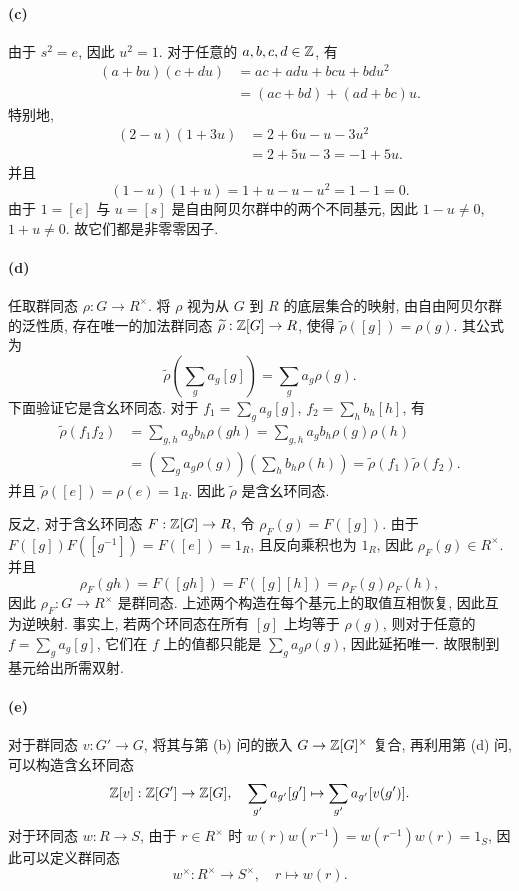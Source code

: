 \documentclass{article}
\begin{document}
\begin{solution}
	\paragraph{(c)} 由于 $s^2 = e$, 因此 $u^2 = 1$. 对于任意的 $a, b, c, d \in \mathbb{Z}$, 有
	\begin{align*}
		(a + bu)(c + du)
		&= ac + adu + bcu + bdu^2 \\
		&= (ac + bd) + (ad + bc)u.
	\end{align*}
	特别地,
	\begin{align*}
		(2 - u)(1 + 3u)
		&= 2 + 6u - u - 3u^2 \\
		&= 2 + 5u - 3 = -1 + 5u.
	\end{align*}
	并且
	\[ (1 - u)(1 + u) = 1 + u - u - u^2 = 1 - 1 = 0. \]
	由于 $1 = [e]$ 与 $u = [s]$ 是自由阿贝尔群中的两个不同基元, 因此 $1 - u \neq 0$, $1 + u \neq 0$. 故它们都是非零零因子.

	\paragraph{(d)} 任取群同态 $\rho: G \to R^\times$. 将 $\rho$ 视为从 $G$ 到 $R$ 的底层集合的映射, 由自由阿贝尔群的泛性质, 存在唯一的加法群同态 $\widetilde{\rho}: \mathbb{Z}[G] \to R$, 使得 $\widetilde{\rho}([g]) = \rho(g)$. 其公式为
	\[ \widetilde{\rho}\left(\sum_g a_g[g]\right) = \sum_g a_g\rho(g). \]
	下面验证它是含幺环同态. 对于 $f_1 = \sum_g a_g[g]$, $f_2 = \sum_h b_h[h]$, 有
	\begin{align*}
		\widetilde{\rho}(f_1f_2)
		&= \sum_{g, h} a_gb_h\rho(gh)
		= \sum_{g, h} a_gb_h\rho(g)\rho(h) \\
		&= \left(\sum_g a_g\rho(g)\right)\left(\sum_h b_h\rho(h)\right)
		= \widetilde{\rho}(f_1)\widetilde{\rho}(f_2).
	\end{align*}
	并且 $\widetilde{\rho}([e]) = \rho(e) = 1_R$. 因此 $\widetilde{\rho}$ 是含幺环同态.

	反之, 对于含幺环同态 $F: \mathbb{Z}[G] \to R$, 令 $\rho_F(g) = F([g])$. 由于 $F([g])F([g^{-1}]) = F([e]) = 1_R$, 且反向乘积也为 $1_R$, 因此 $\rho_F(g) \in R^\times$. 并且
	\[ \rho_F(gh) = F([gh]) = F([g][h]) = \rho_F(g)\rho_F(h), \]
	因此 $\rho_F: G \to R^\times$ 是群同态. 上述两个构造在每个基元上的取值互相恢复, 因此互为逆映射. 事实上, 若两个环同态在所有 $[g]$ 上均等于 $\rho(g)$, 则对于任意的 $f = \sum_g a_g[g]$, 它们在 $f$ 上的值都只能是 $\sum_g a_g\rho(g)$, 因此延拓唯一. 故限制到基元给出所需双射.

	\paragraph{(e)} 对于群同态 $v: G' \to G$, 将其与第 (b) 问的嵌入 $G \to \mathbb{Z}[G]^\times$ 复合, 再利用第 (d) 问, 可以构造含幺环同态
	\[ \mathbb{Z}[v]: \mathbb{Z}[G'] \to \mathbb{Z}[G], \quad \sum_{g'} a_{g'}[g'] \mapsto \sum_{g'} a_{g'}[v(g')]. \]
	对于环同态 $w: R \to S$, 由于 $r \in R^\times$ 时 $w(r)w(r^{-1}) = w(r^{-1})w(r) = 1_S$, 因此可以定义群同态
	\[ w^\times: R^\times \to S^\times, \quad r \mapsto w(r). \]


\end{solution}
\end{document}
